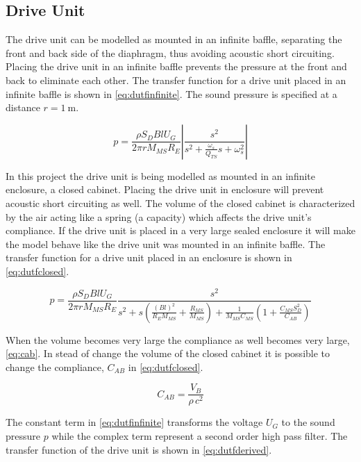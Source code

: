 \subsection{Drive Unit}
\label{seq:driveunit}
The drive unit can be modelled as mounted in an infinite baffle, separating the front and back side of the diaphragm, thus avoiding acoustic short circuiting. 
Placing the drive unit in an infinite baffle prevents the pressure at the front and back to eliminate each other. \cite[p.~44]{Elektroakustik}  
The transfer function for a drive unit placed in an infinite baffle is shown in \cref{eq:dutfinfinite}.
The sound pressure is specified at a distance $r=\SI{1}{\meter}$.  

\begin{equation}
p = \frac{\rho S_D B l U_G}{2\pi r M_{MS} R_E}\left|\frac{s^2}{s^2 + \frac{\omega_s}{Q_{TS}}s+\omega_s^2}\right|
\label{eq:dutfinfinite}
\end{equation}

In this project the drive unit is being modelled as mounted in an infinite enclosure, a closed cabinet.
Placing the drive unit in enclosure will prevent acoustic short circuiting as well. 
The volume of the closed cabinet is characterized by the air acting like a spring (a capacity) which affects the drive unit's compliance.  
If the drive unit is placed in a very large sealed enclosure it will make the model behave like the drive unit was mounted in an infinite baffle.  
The transfer function for a drive unit placed in an enclosure is shown in \cref{eq:dutfclosed}.

\begin{equation}
p = \frac{\rho S_D B l U_G}{2\pi r M_{MS} R_E}\frac{s^2}{s^2 +s \left(\frac{(Bl)^2}{R_EM_{MS}}+\frac{R_{MS}}{M_{MS}}\right)+\frac{1}{M_{MS}C_{MS}}\left(1+\frac{C_{MS}S_D^2}{C_{AB}}\right)}
\label{eq:dutfclosed}
\end{equation}

When the volume becomes very large the compliance as well becomes very large, \cref{eq:cab}. 
In stead of change the volume of the closed cabinet it is possible to change the compliance, $C_{AB}$ in \cref{eq:dutfclosed}. 

\begin{equation}
C_{AB} = \frac{V_B}{\rho \,c^2}
\label{eq:cab}
\end{equation} 

The constant term in \cref{eq:dutfinfinite} transforms the voltage $U_G$ to the sound pressure $p$ while the complex term represent a second order high pass filter.
The transfer function of the drive unit is shown in \cref{eq:dutfderived}.


